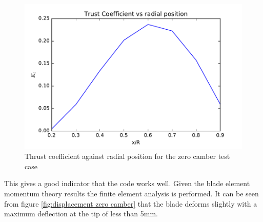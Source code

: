 \documentclass[]{report}
\begin{document}
\begin{figure}
	\centering
	\includegraphics[scale=0.5]{thrust_position.pdf}
	\caption{Thrust coefficient against radial position for the zero camber test case}
	\label{fig:thrust_position}
\end{figure}

This gives a good indicator that the code works well. Given the blade element momentum theory results the finite element analysis is performed. It can be seen from figure \ref{fig:displacement zero camber} that the blade deforms slightly with a maximum deflection at the tip of less than 5mm. 
\end{document}
